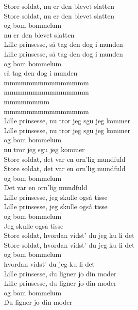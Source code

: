 Store soldat, nu er den blevet slatten \\
Store soldat, nu er den blevet slatten \\
og bom bommelum \\
nu er den blevet slatten \\

Lille prinsesse, så tag den dog i munden \\
Lille prinsesse, så tag den dog i munden \\
og bom bommelum \\
så tag den dog i munden \\

mmmmmmmmmmmmmmm \\
mmmmmmmmmmmmmmm \\
mmmmmmmm \\
mmmmmmmmmmmmmmm \\

Lille prinsesse, nu tror jeg sgu jeg kommer \\
Lille prinsesse, nu tror jeg sgu jeg kommer \\
og bom bommelum \\
nu tror jeg sgu jeg kommer \\

Store soldat, det var en orn'lig mundfuld \\
Store soldat, det var en orn'lig mundfuld \\
og bom bommelum \\
Det var en orn'lig mundfuld \\

Lille prinsesse, jeg skulle også tisse \\
Lille prinsesse, jeg skulle også tisse \\
og bom bommelum \\
Jeg skulle også tisse \\

Store soldat, hvordan vidst’ du jeg ku li det \\
Store soldat, hvordan vidst’ du jeg ku li det \\
og bom bommelum \\
hvordan vidst’ du jeg ku li det \\

Lille prinsesse, du ligner jo din moder \\
Lille prinsesse, du ligner jo din moder \\
og bom bommelum \\
Du ligner jo din moder \\

